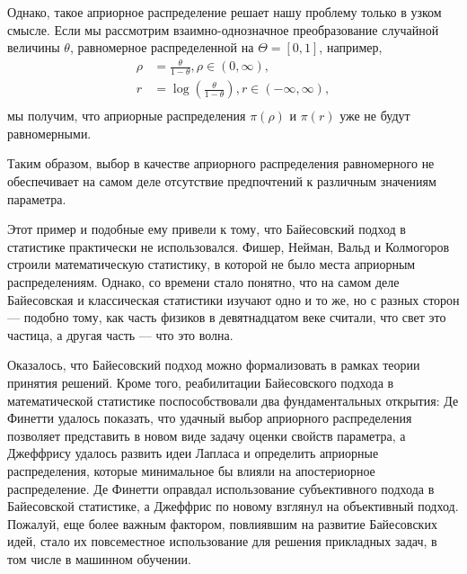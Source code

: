 Однако, такое априорное распределение решает нашу проблему только в узком смысле.
Если мы рассмотрим взаимно-однозначное преобразование случайной величины $\theta$, равномерное распределенной на $\Theta = [0, 1]$, например,
\begin{align*}
\rho &= \frac{\theta}{1 - \theta}, \rho \in (0, \infty), \\
   r &= \log \left( \frac{\theta}{1 - \theta} \right), r \in (-\infty, \infty), \\
\end{align*}
мы получим, что априорные распределения $\pi(\rho)$ и $\pi(r)$ уже не будут равномерными.

Таким образом, выбор в качестве априорного распределения равномерного не обеспечивает на самом деле 
отсутствие предпочтений к различным значениям параметра.

Этот пример и подобные ему привели к тому, что Байесовский подход в статистике практически не использовался.
Фишер, Нейман, Вальд и Колмогоров строили математическую статистику, в которой не было места априорным распределениям.
Однако, со времени стало понятно, что на самом деле Байесовская и классическая статистики изучают одно и то же, 
но с разных сторон --- подобно тому, как часть физиков в девятнадцатом веке считали, что свет это частица,
а другая часть --- что это волна.

Оказалось, что Байесовский подход можно формализовать в рамках теории принятия решений.
Кроме того, реабилитации Байесовского подхода в математической статистике поспособствовали 
два фундаментальных открытия: 
Де Финетти удалось показать, что удачный выбор априорного распределения позволяет представить в новом виде задачу оценки свойств параметра, 
а Джеффрису удалось развить идеи Лапласа и определить априорные распределения, которые минимальное бы влияли на апостериорное распределение.
Де Финетти оправдал использование субъективного подхода в Байесовской статистике, 
а Джеффрис по новому взглянул на объективный подход.
Пожалуй, еще более важным фактором, повлиявшим на развитие Байесовских идей, стало их повсеместное использование для решения прикладных задач,
в том числе в машинном обучении.


